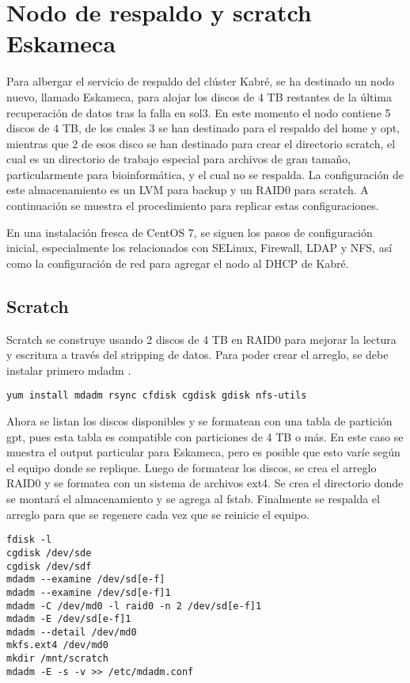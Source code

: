 \chapter{Nodo de respaldo y scratch Eskameca}
Para albergar el servicio de respaldo del clúster Kabré, se ha destinado un nodo nuevo, llamado Eskameca, para alojar los discos de 4 TB restantes de la última recuperación de datos tras la falla en sol3. En este momento el nodo contiene 5 discos de 4 TB, de los cuales 3 se han destinado para el respaldo del home y opt, mientras que 2 de esos disco se han destinado para crear el directorio scratch, el cual es un directorio de trabajo especial para archivos de gran tamaño, particularmente para bioinformática, y el cual no se respalda. La configuración de este almacenamiento es un LVM para backup y un RAID0 para scratch. A continuación se muestra el procedimiento para replicar estas configuraciones.

En una instalación fresca de CentOS 7, se siguen los pasos de configuración inicial, especialmente los relacionados con SELinux, Firewall, LDAP y NFS, así como la configuración de red para agregar el nodo al DHCP de Kabré.

\section{Scratch}
Scratch se construye usando 2 discos de 4 TB en RAID0 para mejorar la lectura y escritura a través del stripping de datos. Para poder crear el arreglo, se debe instalar primero mdadm \cite{raid0}.

\begin{lstlisting}
yum install mdadm rsync cfdisk cgdisk gdisk nfs-utils
\end{lstlisting}

Ahora se listan los discos disponibles y se formatean con una tabla de partición gpt, pues esta tabla es compatible con particiones de 4 TB o más. En este caso se muestra el output particular para Eskameca, pero es posible que esto varíe según el equipo donde se replique. Luego de formatear los discos, se crea el arreglo RAID0 y se formatea con un sistema de archivos ext4. Se crea el directorio donde se montará el almacenamiento y se agrega al fstab. Finalmente se respalda el arreglo para que se regenere cada vez que se reinicie el equipo.

\begin{lstlisting}
fdisk -l
cgdisk /dev/sde
cgdisk /dev/sdf
mdadm --examine /dev/sd[e-f]
mdadm --examine /dev/sd[e-f]1
mdadm -C /dev/md0 -l raid0 -n 2 /dev/sd[e-f]1
mdadm -E /dev/sd[e-f]1
mdadm --detail /dev/md0
mkfs.ext4 /dev/md0
mkdir /mnt/scratch
mdadm -E -s -v >> /etc/mdadm.conf
\end{lstlisting}

